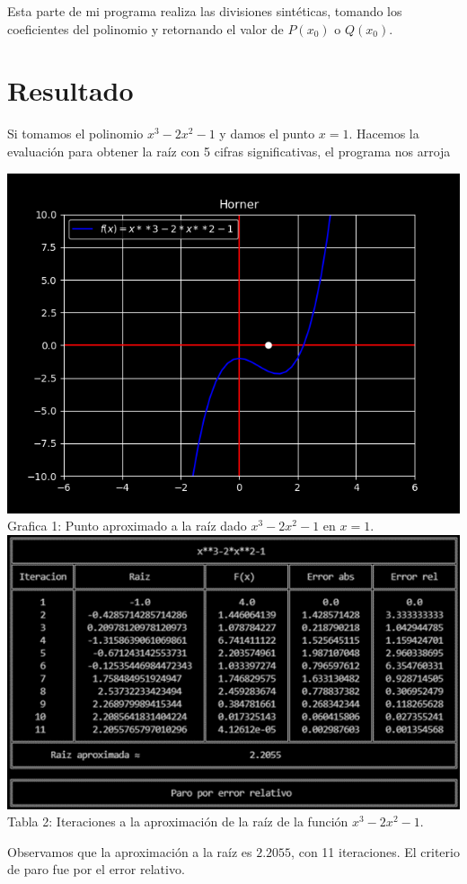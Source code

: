 \documentclass[12pt]{article}
\begin{document}
			Esta parte de mi programa realiza las divisiones sintéticas, tomando los coeficientes del polinomio 
			y retornando el valor de $ P(x_0) $ o $ Q(x_0) $.
		
		\section*{\centering Resultado}\label{sec:Resultado}
			Si tomamos el polinomio $ x^3-2x^2-1 $ y damos el punto $ x = 1 $. Hacemos 
			la evaluación para obtener la raíz con 5 cifras significativas, el programa nos arroja
			\begin{multicols}{2}
				\begin{center}
					\includegraphics[width=\linewidth]{Grafica 1.png}
					Grafica 1: Punto aproximado a la raíz dado \columnbreak $ x^3-2x^2-1 $ en $ x = 1 $.\\
					\includegraphics[width=\linewidth]{Tabla 1.png}
					Tabla 2: Iteraciones a la aproximación de la raíz de la función $ x^3-2x^2-1 $.
				\end{center}
			\end{multicols}
			Observamos que la aproximación a la raíz es $ 2.2055 $, con 11 iteraciones. El criterio de paro fue 
			por el error relativo. \\
\end{document}
